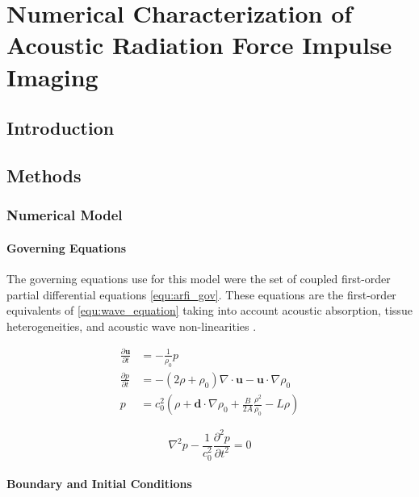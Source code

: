 \chapter{Numerical Characterization of Acoustic Radiation Force Impulse Imaging}
	\section{Introduction}
	\section{Methods}
		\subsection{Numerical Model}
			\subsubsection{Governing Equations}
				The governing equations use for this model were the set of coupled first-order partial differential equations \ref{equ:arfi_gov}. These equations are the first-order equivalents of \ref{equ:wave_equation} taking into account acoustic absorption, tissue heterogeneities, and acoustic wave non-linearities \cite{treeby12}.

				\begin{subequations}
					\label{equ:arfi_gov}
					\begin{align}
						\frac{\partial \mathbf{u}}{\partial t} &= - \frac{1}{\rho_0} p \label{equ:arfi_gov_p1} \\
						\frac{\partial p}{\partial t} &= -\left(2 \rho + \rho_0\right)\nabla \cdot \mathbf{u} - \mathbf{u} \cdot \nabla \rho_0 \label{equ:arfi_gov_p2} \\
						p &= c_0^2 \left(\rho + \mathbf{d} \cdot \nabla \rho_0 + \frac{B}{2A} \frac{\rho^2}{\rho_0} - L\rho \right) \label{equ:arfi_gov_p3}
					\end{align}
				\end{subequations}

				\begin{equation}
					\label{equ:wave_equation}
					\nabla^2 p - \frac{1}{c_0^2}\frac{\partial^2 p}{\partial t^2} = 0
				\end{equation}

			\subsubsection{Boundary and Initial Conditions}
